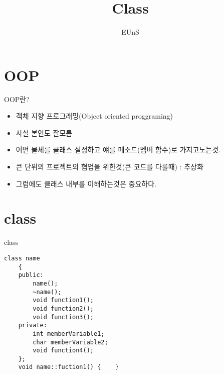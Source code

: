 \documentclass[10pt]{beamer}
\title{Class}
\author{EUnS}
\begin{document}
\begin{frame}
    \maketitle
\end{frame}    

\begin{frame}{}
    \tableofcontents
\end{frame}   

\section{OOP}
\begin{frame}{OOP란?}
    \begin{itemize}
        \item 객체 지향 프로그래밍(Object oriented proggraming)
        \item 사실 본인도 잘모름
        \item 어떤 물체를 클래스 설정하고 얘를 메소드(멤버 함수)로 가지고노는것.
        \item 큰 단위의 프로젝트의 협업을 위한것(큰 코드를 다룰때) : 추상화
        \item 그럼에도 클래스 내부를 이해하는것은 중요하다.
    \end{itemize}
\end{frame}    


\section{class}

\begin{frame}[fragile]{class}
    \begin{lstlisting}[style = CStyle]
    class name
    {
    public:
        name();
        ~name();
        void function1();
        void function2();
        void function3();
    private:
        int memberVariable1;
        char memberVariable2;
        void function4();
    };
    void name::fuction1() {    }
    \end{lstlisting}
\end{frame}    
\end{document}
